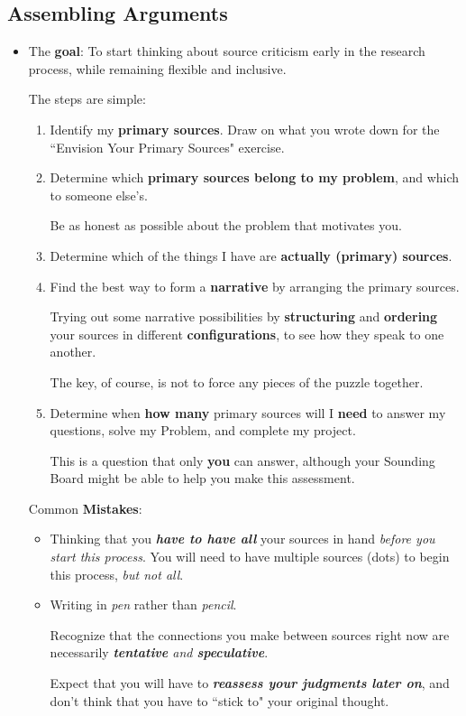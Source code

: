 \documentclass[11pt]{article}
\begin{document}
\subsection{Assembling Arguments}
\begin{itemize}
\item \begin{exercise}

The \textbf{goal}: To start thinking about source criticism early in the research process, while remaining flexible and inclusive.

The steps are simple: 
\begin{enumerate}
\item Identify my \textbf{primary sources}. Draw on what you wrote down for the ``Envision Your Primary Sources" exercise.

\item Determine which \textbf{primary sources belong to my problem}, and which to someone else’s. 

Be as honest as possible about the problem that motivates you.

\item Determine which of the things I have are \textbf{actually (primary) sources}.

\item Find the best way to form a \textbf{narrative} by arranging the primary sources.  

Trying out some narrative possibilities by \textbf{structuring} and \textbf{ordering} your sources in different \textbf{configurations}, to see how they speak to one another. 

The key, of course, is not to force any pieces of the puzzle together.

\item Determine when \textbf{how many} primary sources will I \textbf{need} to answer my questions, solve my Problem, and complete my project.

This is a question that only \textbf{you} can answer, although your Sounding Board might be able to help you make this assessment.
\end{enumerate}
\end{exercise}
Common \textbf{Mistakes}:
\begin{itemize}
\item Thinking that you \textbf{\emph{have to have all}} your sources in hand \emph{before you start this process}. You will need to have multiple sources (dots) to begin this process, \emph{but not all}.

\item Writing in \emph{pen} rather than \emph{pencil}. 

Recognize that the connections you make between sources right now are necessarily \emph{\textbf{tentative} and \textbf{speculative}}.

Expect that you will have to \emph{\textbf{reassess your judgments later on}}, and don’t think that you have to ``stick to" your original thought.
\end{itemize}

\end{itemize}
\end{document}
